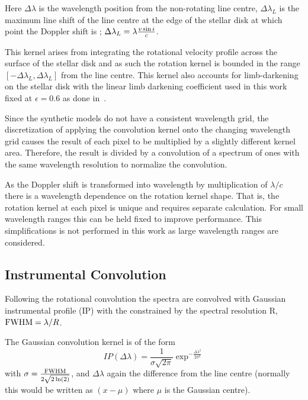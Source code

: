 Here $\Delta\lambda$ is the wavelength position from the non-rotating line centre, $\Delta\lambda_{L}$ is the maximum line shift of the line centre at the edge of the stellar disk at which point the Doppler shift is  \Vsini{}; $\Delta\lambda_{L} = \lambda \frac{v\sin{i}}{c}$.

This kernel arises from integrating the rotational velocity profile across the surface of the stellar disk and as such the rotation kernel is bounded in the range  $[-\Delta\lambda_L, \Delta\lambda_{L}]$ from the line centre.
This kernel also accounts for limb-darkening on the stellar disk with the linear limb darkening coefficient used in this work fixed at $\epsilon=0.6$ as done in~\citet{figueira_radial_2016}.

Since the synthetic models do not have a consistent wavelength grid, the discretization of applying the convolution kernel onto the changing wavelength grid causes the result of each pixel to be multiplied by a slightly different kernel area.
Therefore, the result is divided by a convolution of a spectrum of ones with the same wavelength resolution to normalize the convolution.

As the Doppler shift \Vsini{} is transformed into wavelength by multiplication of $\lambda  / c$ there is a wavelength dependence on the rotation kernel shape.
That is, the rotation kernel at each pixel is unique and requires separate calculation.
For small wavelength ranges this can be held fixed to improve performance.
This simplifications is not performed in this work as large wavelength ranges are considered.


\subsection{Instrumental Convolution}
Following the rotational convolution the spectra are convolved with Gaussian instrumental profile ({\textrm{IP}}) with the {\fwhm}  constrained by the spectral resolution R, $\textrm{FWHM}= \lambda/R$.

The Gaussian convolution kernel is of the form
\begin{equation}
IP(\Delta\lambda) = \frac{1}{\sigma \sqrt{2\pi}} \exp^{-\frac{{\Delta\lambda}^{2}}{2 {\sigma}^{2}}}    \label{eqn:IP_profile}
\end{equation}
with $\sigma = \frac{\textrm{FWHM}}{2\sqrt{2 \ln(2)}}$, and $\Delta \lambda$ again the difference from the line centre (normally this would be written as $(x-\mu)$ where $\mu$ is the Gaussian centre).

